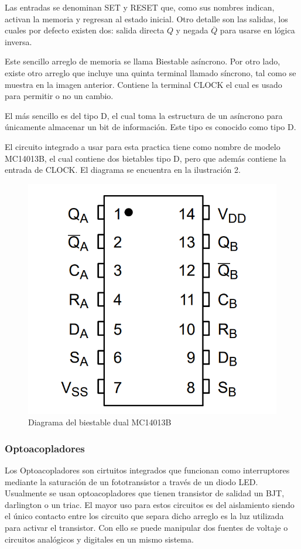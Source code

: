 Las entradas se denominan SET y RESET que, como sus nombres indican, activan la memoria y regresan al estado inicial.
Otro detalle son las salidas, los cuales por defecto existen dos: salida directa \(Q\) y negada \(\overline{Q}\) para
usarse en lógica inversa.

Este sencillo arreglo de memoria se llama Biestable asíncrono. Por otro lado, existe otro arreglo que incluye una quinta
terminal llamado síncrono, tal como se muestra en la imagen anterior. Contiene la terminal CLOCK el cual es usado para
permitir o no un cambio.

El más sencillo es del tipo D, el cual toma la estructura de un asíncrono para únicamente almacenar un bit de información.
Este tipo es conocido como tipo D.

El circuito integrado a usar para esta practica tiene como nombre de modelo MC14013B, el cual contiene dos bietables tipo D,
pero que además contiene la entrada de CLOCK. El diagrama se encuentra en la ilustración 2.

\begin{figure}
    \centering
    \includegraphics[scale=0.5]{media/MC14013B.png}
    \caption{Diagrama del biestable dual MC14013B}
    \label{Fig: Diagrama del biestable dual MC14013B}
\end{figure}

\subsubsection{Optoacopladores}
Los Optoacopladores son cirtuitos integrados que funcionan como interruptores mediante la saturación de un fototransistor
a través de un diodo LED. Usualmente se usan optoacopladores que tienen transistor de salidad un BJT, darlington o un triac.
El mayor uso para estos circuitos es del aislamiento siendo el único contacto entre los circuito que separa dicho arreglo
es la luz utilizada para activar el transistor. Con ello se puede manipular dos fuentes de voltaje o circuitos analógicos y
digitales en un mismo sistema. \parencite{bera2012opto}

